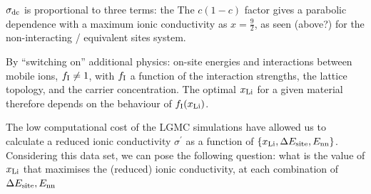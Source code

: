 \documentclass[aps,prb,twocolumn,superscriptaddress,reprint]{revtex4-1}
\newcommand{\xLi}{x_\m{Li}}
\begin{document}
$\sigma_{\mathrm{dc}}$ is proportional to three terms: the 
The $c(1-c)$ factor gives a parabolic dependence with a maximum ionic conductivity as $x=\frac{9}{2}$, as seen (above?) for the non-interacting / equivalent sites system. 

By ``switching on'' additional physics: on-site energies and interactions between mobile ions, $f_{\mathrm{I}}\neq1$, with $f_{\mathrm{I}}$ a function of the interaction strengths, the lattice topology, and the carrier concentration. 
The optimal $\xLi$ for a given material therefore depends on the behaviour of $f_{\mathrm{I}}(x_{\mathrm{Li}})$.

The low computational cost of the LGMC simulations have allowed us to calculate a reduced ionic conductivity $\sigma^\prime$ as a function of $\left\{\xLi, \Delta E_\m{site}, E_\m{nn}\right\}$. 
Considering this data set, we can pose the following question: what is the value of $\xLi$ that maximises the (reduced) ionic conductivity, at each combination of $\Delta E_{\mathrm{site}}, E_{\mathrm{nn}}$
\end{document}
